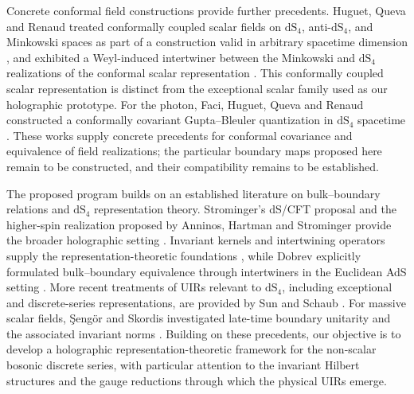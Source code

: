 \documentclass{SciPost}
\begin{document}
Concrete conformal field constructions provide further precedents. Huguet, Queva and Renaud treated conformally coupled scalar fields on $\mathrm{dS}_{4}$, anti-$\mathrm{dS}_{4}$, and Minkowski spaces as part of a construction valid in arbitrary spacetime dimension \cite{HuguetQuevaRenaud2006}, and exhibited a Weyl-induced intertwiner between the Minkowski and $\mathrm{dS}_{4}$ realizations of the conformal scalar representation \cite{HuguetQuevaRenaud2008}. This conformally coupled scalar representation is distinct from the exceptional scalar family used as our holographic prototype. For the photon, Faci, Huguet, Queva and Renaud constructed a conformally covariant Gupta--Bleuler quantization in $\mathrm{dS}_{4}$ spacetime \cite{FaciHuguetQuevaRenaud2009}. These works supply concrete precedents for conformal covariance and equivalence of field realizations; the particular boundary maps proposed here remain to be constructed, and their compatibility remains to be established.

The proposed program builds on an established literature on bulk--boundary relations and $\mathrm{dS}_{4}$ representation theory. Strominger's dS/CFT proposal and the higher-spin realization proposed by Anninos, Hartman and Strominger provide the broader holographic setting \cite{Strominger2001, Anninos2017}. Invariant kernels and intertwining operators supply the representation-theoretic foundations \cite{KnappStein1971, Dobrev1977}, while Dobrev explicitly formulated bulk--boundary equivalence through intertwiners in the Euclidean AdS setting \cite{Dobrev1999}. More recent treatments of UIRs relevant to $\mathrm{dS}_{4}$, including exceptional and discrete-series representations, are provided by Sun and Schaub \cite{Sun2025, Schaub2024}. For massive scalar fields, \c{S}eng\"or and Skordis investigated late-time boundary unitarity and the associated invariant norms \cite{SengorSkordis2020}. Building on these precedents, our objective is to develop a holographic representation-theoretic framework for the non-scalar bosonic discrete series, with particular attention to the invariant Hilbert structures and the gauge reductions through which the physical UIRs emerge.
\end{document}
